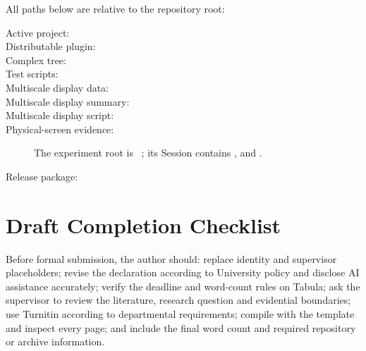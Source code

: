 All paths below are relative to the repository root:
\begin{description}
    \item[Active project:] 
    \item[Distributable plugin:] 
    \item[Complex tree:] 
    \item[Test scripts:] 
    \item[Multiscale display data:] 
    \item[Multiscale display summary:] 
    \item[Multiscale display script:] 
    \item[Physical-screen evidence:] The experiment root is \ ; its  Session contains ,  and .
    \item[Release package:] 
\end{description}

\chapter{Draft Completion Checklist}

Before formal submission, the author should: replace identity and supervisor placeholders; revise the declaration according to University policy and disclose AI assistance accurately; verify the deadline and word-count rules on Tabula; ask the supervisor to review the literature, research question and evidential boundaries; use Turnitin according to departmental requirements; compile with the template and inspect every page; and include the final word count and required repository or archive information.
